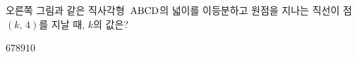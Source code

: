 \noindent\begin{minipage}[t]{0.58\linewidth}\vspace{0pt}오른쪽 그림과 같은 직사각형~$\mathrm{ABCD}$의 넓이를 이등분하고 원점을 지나는 직선이 점~$(k,\,4)$를 지날 때, $k$의 값은?\end{minipage}\hfill\begin{minipage}[t]{0.4\linewidth}\vspace{0pt}\centering \end{minipage}\par
\begin{choices32}{$6$}{$7$}{$8$}{$9$}{$10$}\end{choices32}
